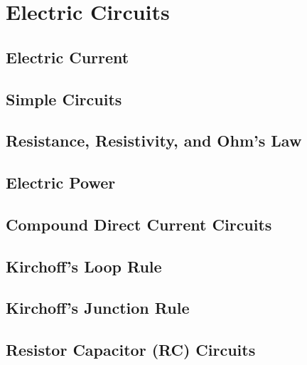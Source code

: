 \documentclass[../em.tex]{subfiles}
\begin{document}
\chapter{Electric Circuits}
\section{Electric Current}
\section{Simple Circuits}
\section{Resistance, Resistivity, and Ohm's Law}
\section{Electric Power}
\section{Compound Direct Current Circuits}
\section{Kirchoff's Loop Rule}
\section{Kirchoff's Junction Rule}
\section{Resistor Capacitor (RC) Circuits}
\end{document}
